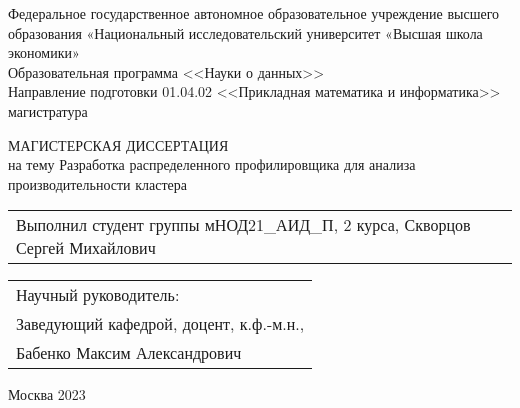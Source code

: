 \begin{titlepage}
 \newpage

 {\bf\footnotesize
  \begin{center}
   Федеральное государственное автономное образовательное учреждение высшего образования «Национальный исследовательский университет «Высшая школа экономики»
   \\
   \bigskip
   Образовательная программа <<Науки о данных>> \\
   Направление подготовки 01.04.02 <<Прикладная математика и информатика>> \\
   магистратура
  \end{center}
 }

 \vspace{8em}

 \begin{center}
 {\Large МАГИСТЕРСКАЯ ДИССЕРТАЦИЯ\\
  \smallskip
  на тему}
  \linebreak
  Разработка распределенного профилировщика для анализа производительности кластера
 \end{center}

 \vspace{7em}

 \begin{flushleft}
  \begin{tabular}{p{}}
  Выполнил студент группы мНОД21\_АИД\_П, 2 курса,
  \linebreak
  \hspace*{2em} Скворцов Сергей Михайлович \\
  \end{tabular}
 \end{flushleft}

 \vspace{2em}

 \begin{flushleft}
 \begin{tabular}{p{}}
  Научный руководитель: \\
    \hspace*{2em} Заведующий кафедрой, доцент, к.ф.-м.н., \\
    \hspace*{2em} Бабенко Максим Александрович
 \end{tabular}
\end{flushleft}


 \vspace{\fill}

 \begin{center}
     Москва 2023
 \end{center}

\end{titlepage}
